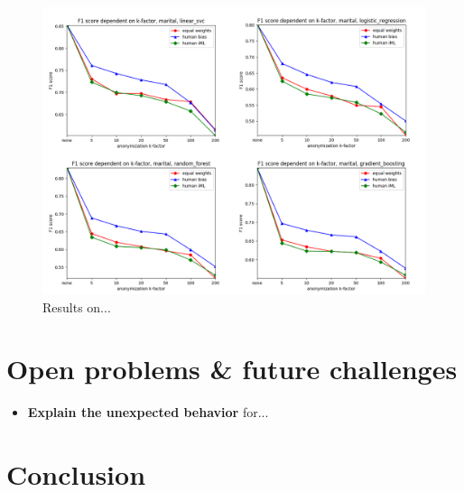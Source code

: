 \documentclass{llncs}
\begin{document}
\begin{figure}[!h]
	\begin{center}
		\vspace{-1.0cm}
		\hspace*{-0.8cm}
		\includegraphics[width=1.0\textwidth]{figures/marital_status.png}
		\caption{Results on...}
		\label{fig:results_income}
	\end{center}
\end{figure}



\section{Open problems \& future challenges}
\label{sect:op_fc}

\begin{itemize}
	\item \textbf{Explain the unexpected behavior} for...
\end{itemize}


\section{Conclusion}
\label{sect:conclusion}


\newpage



\end{document}
